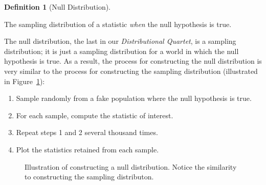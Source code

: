 \documentclass[
  letterpaper,
  DIV=11,
  numbers=noendperiod]{scrreprt}
\providecommand{\tightlist}{%
  \setlength{\itemsep}{0pt}\setlength{\parskip}{0pt}}\usepackage{longtable,booktabs,array}
\theoremstyle{plain}
\theoremstyle{definition}
\theoremstyle{definition}
\newtheorem{definition}{Definition}[chapter]
\theoremstyle{remark}
\begin{document}
\begin{definition}[Null
Distribution]\protect\hypertarget{def-null-distribution}{}\label{def-null-distribution}

The sampling distribution of a statistic \emph{when} the null hypothesis
is true.

\end{definition}

The null distribution, the last in our \emph{Distributional Quartet}, is
a sampling distribution; it is just a sampling distribution for a world
in which the null hypothesis is true. As a result, the process for
constructing the null distribution is very similar to the process for
constructing the sampling distribution (illustrated in
Figure~\ref{fig-nulldistns-null-distribution}):

\begin{enumerate}
\def\labelenumi{\arabic{enumi}.}
\tightlist
\item
  Sample randomly from a fake population where the null hypothesis is
  true.
\item
  For each sample, compute the statistic of interest.
\item
  Repeat steps 1 and 2 several thousand times.
\item
  Plot the statistics retained from each sample.
\end{enumerate}

\begin{figure}


\caption{\label{fig-nulldistns-null-distribution}Illustration of
constructing a null distribution. Notice the similarity to constructing
the sampling distributon.}

\end{figure}%
\end{document}
